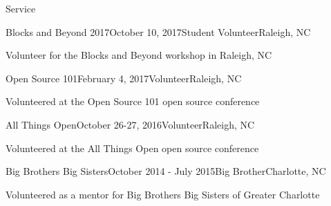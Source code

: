 \documentclass{resume} %
\begin{document}
\begin{rSection}{Service}
\begin{rSubsection}{Blocks and Beyond 2017}{October 10, 2017}{Student Volunteer}{Raleigh, NC}
\item Volunteer for the Blocks and Beyond workshop in Raleigh, NC
\end{rSubsection}
\begin{rSubsection}{Open Source 101}{February 4, 2017}{Volunteer}{Raleigh, NC}
\item Volunteered at the Open Source 101 open source conference
\end{rSubsection}
\begin{rSubsection}{All Things Open}{October 26-27, 2016}{Volunteer}{Raleigh, NC}
\item Volunteered at the All Things Open open source conference
\end{rSubsection}
\begin{rSubsection}{Big Brothers Big Sisters}{October 2014 - July 2015}{Big Brother}{Charlotte, NC}
\item Volunteered as a mentor for Big Brothers Big Sisters of Greater Charlotte
\end{rSubsection}
\end{rSection}

\end{document}
